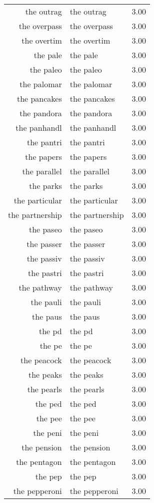 \begin{table}[ht]
\begin{tabular}{rlr}
  the outrag & the outrag & 3.00 \\ 
  the overpass & the overpass & 3.00 \\ 
  the overtim & the overtim & 3.00 \\ 
  the pale & the pale & 3.00 \\ 
  the paleo & the paleo & 3.00 \\ 
  the palomar & the palomar & 3.00 \\ 
  the pancakes & the pancakes & 3.00 \\ 
  the pandora & the pandora & 3.00 \\ 
  the panhandl & the panhandl & 3.00 \\ 
  the pantri & the pantri & 3.00 \\ 
  the papers & the papers & 3.00 \\ 
  the parallel & the parallel & 3.00 \\ 
  the parks & the parks & 3.00 \\ 
  the particular & the particular & 3.00 \\ 
  the partnership & the partnership & 3.00 \\ 
  the paseo & the paseo & 3.00 \\ 
  the passer & the passer & 3.00 \\ 
  the passiv & the passiv & 3.00 \\ 
  the pastri & the pastri & 3.00 \\ 
  the pathway & the pathway & 3.00 \\ 
  the pauli & the pauli & 3.00 \\ 
  the paus & the paus & 3.00 \\ 
  the pd & the pd & 3.00 \\ 
  the pe & the pe & 3.00 \\ 
  the peacock & the peacock & 3.00 \\ 
  the peaks & the peaks & 3.00 \\ 
  the pearls & the pearls & 3.00 \\ 
  the ped & the ped & 3.00 \\ 
  the pee & the pee & 3.00 \\ 
  the peni & the peni & 3.00 \\ 
  the pension & the pension & 3.00 \\ 
  the pentagon & the pentagon & 3.00 \\ 
  the pep & the pep & 3.00 \\ 
  the pepperoni & the pepperoni & 3.00 \\ 

\end{tabular}
\end{table}
